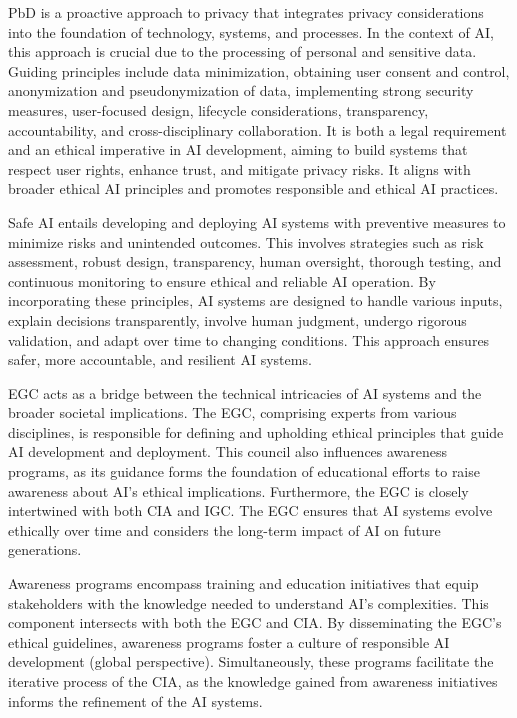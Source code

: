 \documentclass{article}
\begin{document}
PbD is a proactive approach to privacy that integrates privacy considerations into the foundation of technology, systems, and processes. In the context of AI, this approach is crucial due to the processing of personal and sensitive data. Guiding principles include data minimization, obtaining user consent and control, anonymization and pseudonymization of data, implementing strong security measures, user-focused design, lifecycle considerations, transparency, accountability, and cross-disciplinary collaboration. It is both a legal requirement and an ethical imperative in AI development, aiming to build systems that respect user rights, enhance trust, and mitigate privacy risks. It aligns with broader ethical AI principles and promotes responsible and ethical AI practices.

Safe AI entails developing and deploying AI systems with preventive measures to minimize risks and unintended outcomes. This involves strategies such as risk assessment, robust design, transparency, human oversight, thorough testing, and continuous monitoring to ensure ethical and reliable AI operation. By incorporating these principles, AI systems are designed to handle various inputs, explain decisions transparently, involve human judgment, undergo rigorous validation, and adapt over time to changing conditions. This approach ensures safer, more accountable, and resilient AI systems.

EGC acts as a bridge between the technical intricacies of AI systems and the broader societal implications. The EGC, comprising experts from various disciplines, is responsible for defining and upholding ethical principles that guide AI development and deployment. This council also influences awareness programs, as its guidance forms the foundation of educational efforts to raise awareness about AI's ethical implications. Furthermore, the EGC is closely intertwined with both CIA and IGC. The EGC ensures that AI systems evolve ethically over time and considers the long-term impact of AI on future generations.

Awareness programs encompass training and education initiatives that equip stakeholders with the knowledge needed to understand AI's complexities. This component intersects with both the EGC and CIA. By disseminating the EGC's ethical guidelines, awareness programs foster a culture of responsible AI development (global perspective). Simultaneously, these programs facilitate the iterative process of the CIA, as the knowledge gained from awareness initiatives informs the refinement of the AI systems.
\end{document}
